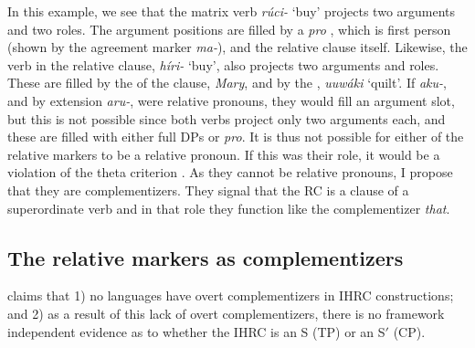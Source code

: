 \documentclass[output=paper]{LSP/langsci}
\begin{document}
In this example, we see that the matrix verb \textit{r\'uci-} `buy' projects two arguments and two  roles. The argument positions are filled by a \textit{pro} , which is first person (shown by the agreement marker \textit{ma-}), and the relative clause itself. Likewise, the verb in the relative clause, \textit{h\'iri-} `buy', also projects two arguments and  roles. These are filled by the  of the clause, \textit{Mary}, and by the , \textit{uuw\'aki} `quilt'. If \textit{aku-}, and by extension \textit{aru-}, were relative pronouns, they would fill an argument slot, but this is not possible since both verbs project only two arguments each, and these are filled with either full DPs or \textit{pro}. It is thus not possible for either of the  relative markers to be a relative pronoun. If this was their role, it would be a violation of the theta criterion \citep[36]{Chomsky1981}. As they cannot be relative pronouns, I propose that they are complementizers. They signal that the RC is a  clause of a superordinate verb and in that role they function like the  complementizer \textit{that}. 

\subsection{The  relative markers as complementizers}\label{sec:boyle:5.2}

\citet{Culy1990} claims that 1) no languages have overt complementizers in IHRC constructions; and 2) as a result of this lack of overt complementizers, there is no framework independent evidence as to whether the IHRC is an S (TP) or an S$'$ (CP).  
\end{document}
